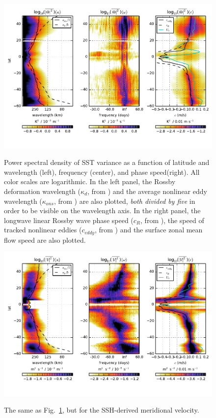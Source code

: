 \documentclass[10pt]{article}
\begin{document}
\begin{figure}[t]
  \noindent\includegraphics{../figures/SAT_50degwide/integrated_spectra_T.pdf}\\
  \caption{Power spectral density of SST variance as a function of latitude and wavelength (left), frequency (center), and phase speed(right). All color scales are logarithmic. In the left panel, the Rossby deformation wavelength ($\kappa_d$, from \citealt{TullochEtAl2011}) and the average nonlinear eddy wavelength ($\kappa_{ons}$, from \citealt{CheltonEtAl2011}) are also plotted, {\em both divided by five} in order to be visible on the wavelength axis. In the right panel, the longwave linear Rossby wave phase speed ($c_R$, from \citealt{TullochEtAl2011}), the speed of tracked nonlinear eddies ($c_{eddy}$, from \citealt{CheltonEtAl2011}) and the surface zonal mean flow speed are also plotted.}
  \label{fig:integrated_spectra_T}
\end{figure}

\begin{figure}[t]
  \noindent\includegraphics{../figures/SAT_50degwide/integrated_spectra_V.pdf}\\
  \caption{The same as Fig.~\ref{fig:integrated_spectra_T}, but for the SSH-derived meridional velocity.}
  \label{fig:integrated_spectra_V}
\end{figure}
\end{document}
